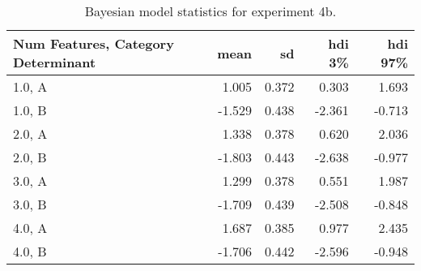 \begin{table}
    \centering
    \label{tab:exp5-bayes-model-results}
    \caption{Bayesian model statistics for experiment 4b.}
    \begin{tabular}{lrrrr}
        \toprule
         Num Features, Category Determinant & mean & sd & hdi 3\% & hdi 97\% \\
        \midrule
        1.0, A & 1.005 & 0.372 & 0.303 & 1.693 \\
        1.0, B & -1.529 & 0.438 & -2.361 & -0.713 \\
        2.0, A & 1.338 & 0.378 & 0.620 & 2.036 \\
        2.0, B & -1.803 & 0.443 & -2.638 & -0.977 \\
        3.0, A & 1.299 & 0.378 & 0.551 & 1.987 \\
        3.0, B & -1.709 & 0.439 & -2.508 & -0.848 \\
        4.0, A & 1.687 & 0.385 & 0.977 & 2.435 \\
        4.0, B & -1.706 & 0.442 & -2.596 & -0.948 \\
        \bottomrule
        \end{tabular}
        
\end{table}